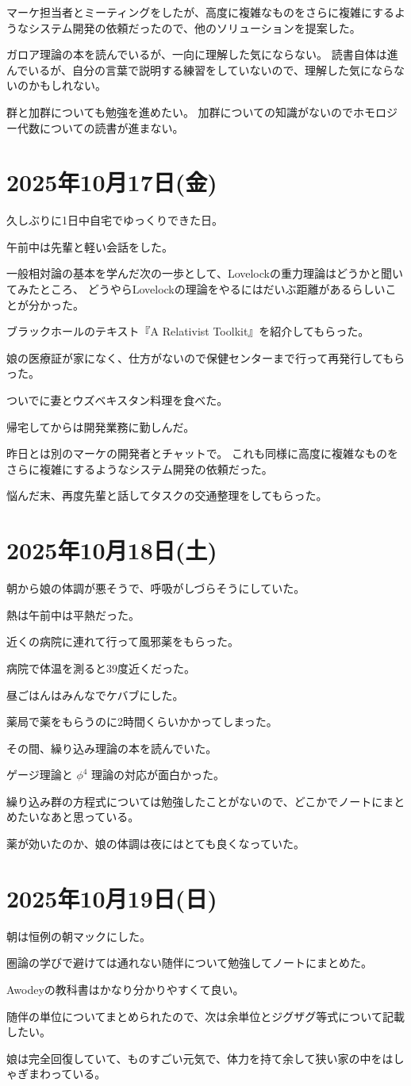\documentclass[uplatex]{jsarticle}
\begin{document}
マーケ担当者とミーティングをしたが、高度に複雑なものをさらに複雑にするようなシステム開発の依頼だったので、他のソリューションを提案した。

ガロア理論の本を読んでいるが、一向に理解した気にならない。
読書自体は進んでいるが、自分の言葉で説明する練習をしていないので、理解した気にならないのかもしれない。

群と加群についても勉強を進めたい。
加群についての知識がないのでホモロジー代数についての読書が進まない。

\section{2025年10月17日(金)}

久しぶりに1日中自宅でゆっくりできた日。

午前中は先輩と軽い会話をした。

一般相対論の基本を学んだ次の一歩として、Lovelockの重力理論はどうかと聞いてみたところ、
どうやらLovelockの理論をやるにはだいぶ距離があるらしいことが分かった。

ブラックホールのテキスト『A Relativist Toolkit』を紹介してもらった。

娘の医療証が家になく、仕方がないので保健センターまで行って再発行してもらった。

ついでに妻とウズベキスタン料理を食べた。

帰宅してからは開発業務に勤しんだ。

昨日とは別のマーケの開発者とチャットで。
これも同様に高度に複雑なものをさらに複雑にするようなシステム開発の依頼だった。

悩んだ末、再度先輩と話してタスクの交通整理をしてもらった。

\section{2025年10月18日(土)}

朝から娘の体調が悪そうで、呼吸がしづらそうにしていた。

熱は午前中は平熱だった。

近くの病院に連れて行って風邪薬をもらった。

病院で体温を測ると39度近くだった。

昼ごはんはみんなでケバブにした。

薬局で薬をもらうのに2時間くらいかかってしまった。

その間、繰り込み理論の本を読んでいた。

ゲージ理論と $\phi^{4}$ 理論の対応が面白かった。

繰り込み群の方程式については勉強したことがないので、どこかでノートにまとめたいなあと思っている。

薬が効いたのか、娘の体調は夜にはとても良くなっていた。

\section{2025年10月19日(日)}

朝は恒例の朝マックにした。

圏論の学びで避けては通れない随伴について勉強してノートにまとめた。

Awodeyの教科書はかなり分かりやすくて良い。

随伴の単位についてまとめられたので、次は余単位とジグザグ等式について記載したい。

娘は完全回復していて、ものすごい元気で、体力を持て余して狭い家の中をはしゃぎまわっている。
\end{document}
